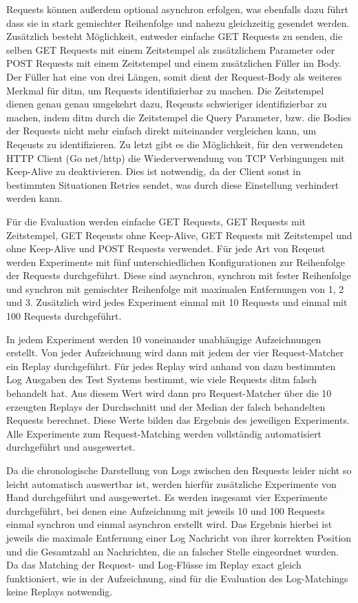 \documentclass[12pt,a4paper]{report}
\begin{document}
Requests können außerdem optional asynchron erfolgen, was ebenfalls dazu führt dass sie in stark gemischter Reihenfolge und nahezu gleichzeitig
gesendet werden.
Zusätzlich besteht Möglichkeit, entweder einfache GET Requests zu senden, die selben GET Requests mit einem Zeitstempel
als zusätzlichem Parameter oder POST Requests mit einem Zeitstempel und einem zusätzlichen Füller im Body. Der Füller hat eine von
drei Längen, somit dient der Request-Body als weiteres Merkmal für ditm, um Requests identifizierbar zu machen. Die Zeitstempel dienen
genau genau umgekehrt dazu, Reqeusts schwieriger identifizierbar zu machen, indem ditm durch die Zeitstempel die Query Parameter,
bzw. die Bodies der Requests nicht mehr einfach direkt miteinander vergleichen kann, um Reqeusts zu identifizieren.
Zu letzt gibt es die Möglichkeit, für den verwendeten HTTP Client (Go net/http) die Wiederverwendung von TCP Verbingungen mit Keep-Alive
zu deaktivieren. Dies ist notwendig, da der Client sonst in bestimmten Situationen Retries sendet, was durch diese Einstellung
verhindert werden kann.

Für die Evaluation werden einfache GET Requests, GET Requests mit Zeitstempel, GET Reqeusts ohne Keep-Alive, GET Requests mit
Zeitstempel und ohne Keep-Alive und POST Requests verwendet. Für jede Art von Reqeust werden Experimente mit fünf unterschiedlichen
Konfigurationen zur Reihenfolge der Requests durchgeführt. Diese sind asynchron, synchron mit fester Reihenfolge und synchron mit gemischter
Reihenfolge mit maximalen Entfernungen von 1, 2 und 3. Zusätzlich wird jedes Experiment einmal mit 10 Requests und einmal mit 100 Requests
durchgeführt.

In jedem Experiment werden 10 voneinander unabhängige Aufzeichnungen erstellt. Von jeder Aufzeichnung wird dann mit jedem der vier
Request-Matcher ein Replay durchgeführt. Für jedes Replay wird anhand von dazu bestimmten Log Ausgaben des Test Systems bestimmt,
wie viele Requests ditm falsch behandelt hat. Aus diesem Wert wird dann pro Request-Matcher über die 10 erzeugten Replays der Durchschnitt
und der Median der falsch behandelten Requests berechnet. Diese Werte bilden das Ergebnis des jeweiligen Experiments.
Alle Experimente zum Request-Matching werden vollständig automatisiert durchgeführt und ausgewertet. %

Da die chronologische Darstellung von Logs zwischen den Requests leider nicht so leicht automatisch auswertbar ist, werden hierfür
zusätzliche Experimente von Hand durchgeführt und ausgewertet. Es werden insgesamt vier Experimente durchgeführt, bei denen eine
Aufzeichnung mit jeweils 10 und 100 Requests einmal synchron und einmal asynchron erstellt wird. Das Ergebnis hierbei ist jeweils
die maximale Entfernung einer Log Nachricht von ihrer korrekten Position und die Gesamtzahl an Nachrichten, die an falscher Stelle
eingeordnet wurden. Da das Matching der Request- und Log-Flüsse im Replay exact gleich funktioniert, wie in der Aufzeichnung, sind
für die Evaluation des Log-Matchings keine Replays notwendig.
\end{document}
